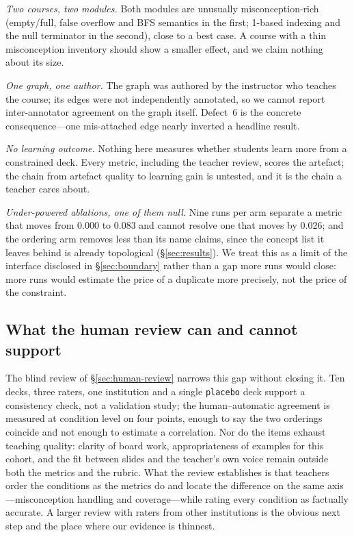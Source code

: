\documentclass[review,12pt]{elsarticle}
\renewcommand{\_}{\kgunderscore\allowbreak}
\newcommand{\id}[1]{\texttt{#1}}
\begin{document}
\emph{Two courses, two modules.} Both modules are unusually misconception-rich
(empty/full, false overflow and BFS semantics in the first; 1-based indexing
and the null terminator in the second), close to a best case. A course with a
thin misconception inventory should show a smaller effect, and we claim
nothing about its size.

\emph{One graph, one author.} The graph was authored by the instructor who
teaches the course; its edges were not independently annotated, so we cannot
report inter-annotator agreement on the graph itself. Defect~6 is the concrete
consequence---one mis-attached edge nearly inverted a headline result.

\emph{No learning outcome.} Nothing here measures whether students learn more
from a constrained deck. Every metric, including the teacher review, scores the
artefact; the chain from artefact quality to learning gain is untested, and it
is the chain a teacher cares about.

\emph{Under-powered ablations, one of them null.} Nine runs per arm separate a
metric that moves from 0.000 to 0.083 and cannot resolve one that moves by
0.026; and the ordering arm removes less than its name claims, since the
concept list it leaves behind is already topological (\S\ref{sec:results}). We
treat this as a limit of the interface disclosed in \S\ref{sec:boundary} rather
than a gap more runs would close: more runs would estimate the price of a
duplicate more precisely, not the price of the constraint.

\subsection{What the human review can and cannot support}

The blind review of \S\ref{sec:human-review} narrows this gap without closing
it. Ten decks, three raters, one institution and a single \id{placebo} deck
support a consistency check, not a validation study; the human--automatic
agreement is measured at condition level on four points, enough to say the two
orderings coincide and not enough to estimate a correlation. Nor do the items
exhaust teaching quality: clarity of board work, appropriateness of examples
for this cohort, and the fit between slides and the teacher's own voice remain
outside both the metrics and the rubric. What the review establishes is that
teachers order the conditions as the metrics do and locate the difference on
the same axis---misconception handling and coverage---while rating every
condition as factually accurate. A larger review with raters from other
institutions is the obvious next step and the place where our evidence is
thinnest.
\end{document}
